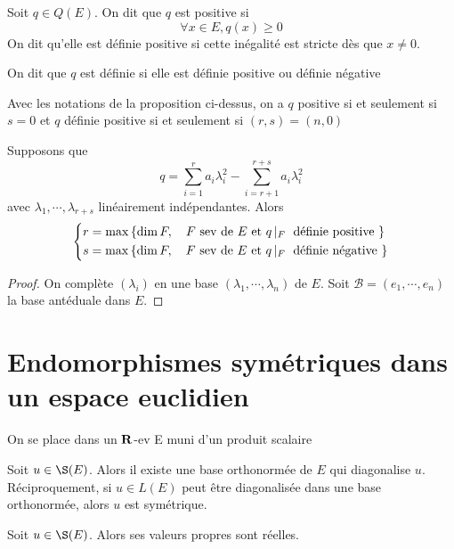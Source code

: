 \begin{dfn}
    Soit $q \in  Q(E)$. On dit que $q$ est positive si \[
        \forall  x \in  E, q(x)\geq 0
    \] 
    On dit qu'elle est définie positive si cette inégalité est stricte dès que $x\neq 0$.

    On dit que $q$ est définie si elle est définie positive ou définie négative
\end{dfn}

\begin{rem}
    Avec les notations de la proposition ci-dessus, on a $q$ positive  si et seulement si $s=0$ et  $q$ définie positive  si et seulement si $(r, s)=(n, 0)$
\end{rem}

\begin{thm}
Supposons que \[
    q=\sum_{i=1}^r a_i \lambda_i^2 -\sum_{i=r+1}^{r+s}a_i \lambda_i^2 
\] 
avec $ \lambda_1, \cdots , \lambda_{r+s}$ linéairement indépendantes. Alors \[
    \begin{dcases}
r=\max \left\{ \dim F, \quad  F \text{ sev  de }  E \text{ et } q\left|_{F}\right. \text{ définie positive }\right\} \\
s=\max \left\{ \dim F, \quad  F \text{ sev  de }  E \text{ et } q\left|_{F}\right. \text{ définie négative }\right\} 
    \end{dcases}
\] 
\end{thm}

\begin{proof}
    On complète $(\lambda_i)$ en une base $(\lambda_1, \cdots , \lambda_n)$ de $E$. Soit  $\mathcal  B=(e_1, \cdots , e_n)$ la base antéduale dans $E$.
\end{proof}

\section{Endomorphismes symétriques dans un espace euclidien}


On se place dans un $ \mathbf R$-ev E muni d'un produit scalaire

\begin{thm}
    Soit $u \in  \S(E)$. Alors il existe une base orthonormée de $E$ qui diagonalise  $u$. Réciproquement, si  $u \in  L(E)$ peut être diagonalisée dans une base orthonormée, alors  $u$ est symétrique.
\end{thm}

\begin{lmm}
    Soit $u \in  \S(E)$. Alors ses valeurs propres sont réelles.
\end{lmm}

